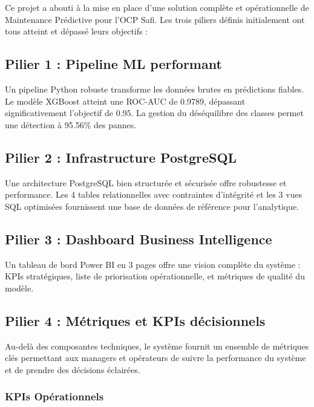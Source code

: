 \documentclass[a4paper,12pt,twoside]{report}
\begin{document}
Ce projet a abouti à la mise en place d'une solution complète et opérationnelle de Maintenance Prédictive pour l'OCP Safi. Les trois piliers définis initialement ont tous atteint et dépassé leurs objectifs :

\subsection{Pilier 1 : Pipeline ML performant}

Un pipeline Python robuste transforme les données brutes en prédictions fiables. Le modèle XGBoost atteint une ROC-AUC de 0.9789, dépassant significativement l'objectif de 0.95. La gestion du déséquilibre des classes permet une détection à 95.56\% des pannes.

\subsection{Pilier 2 : Infrastructure PostgreSQL}

Une architecture PostgreSQL bien structurée et sécurisée offre robustesse et performance. Les 4 tables relationnelles avec contraintes d'intégrité et les 3 vues SQL optimisées fournissent une base de données de référence pour l'analytique.

\subsection{Pilier 3 : Dashboard Business Intelligence}

Un tableau de bord Power BI en 3 pages offre une vision complète du système : KPIs stratégiques, liste de priorisation opérationnelle, et métriques de qualité du modèle.

\subsection{Pilier 4 : Métriques et KPIs décisionnels}

Au-delà des composantes techniques, le système fournit un ensemble de métriques clés permettant aux managers et opérateurs de suivre la performance du système et de prendre des décisions éclairées.

\subsubsection{KPIs Opérationnels}
\end{document}
